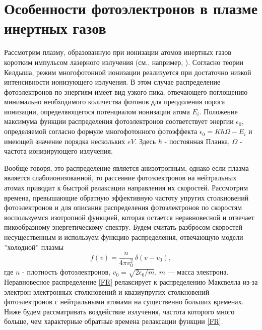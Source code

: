 \documentclass[12pt,a4paper]{article}
\numberwithin{equation}{section}
\begin{document}
\section{Особенности фотоэлектронов в плазме инертных газов}
Рассмотрим плазму, образованную при ионизации атомов инертных газов коротким импульсом лазерного излучения (см., например, \cite{refAGOSTINI1,refAGOSTINI2,refPOPOV}). Согласно теории Келдыша, режим многофотонной ионизации реализуется при достаточно низкой интенсивности ионизующего излучения. В этом случае распределение фотоэлектронов по энергиям имеет вид узкого пика, отвечающего поглощению минимально необходимого количества фотонов для преодоления порога ионизации, определяющегося потенциалом ионизации атома $E_i$. Положение максимума функции распределения фотоэлектронов соответствует энергии $\epsilon_0$, определяемой согласно формуле многофотонного фотоэффекта $\epsilon_0=K\hbar\Omega-E_i$ и имеющей значение порядка нескольких $eV$. Здесь $\hbar$ - постоянная Планка, $\Omega$ - частота ионизирующего излучения.

Вообще говоря, это распределение является анизотропным, однако если плазма является слабоионизованной, то рассеяние фотоэлектронов на нейтральных атомах приводит к быстрой релаксации направления их скоростей. Рассмотрим времена, превышающие обратную эффективную частоту упругих столкновений фотоэлектронов и для описания распределения фотоэлектронов по скоростям воспользуемся изотропной функцией, которая остается неравновесной и отвечает пикообразному энергетическому спектру. Будем считать разбросом скоростей несущественным и используем функцию распределения, отвечающую модели ''холодной'' плазмы
\begin{equation}
\label{FR}
f\left(v\right)=\frac{n}{4\pi v_0^2}\, \delta\left(v-v_0\right),
\end{equation}	
где $n$ - плотность фотоэлектронов, $v_0 = \sqrt{2\epsilon_0/m}$, $m$ — масса электрона. Неравновесное распределение \eqref{FR} релаксирует к распределению Максвелла из-за электрон-электронных столкновений и квазиупругих столкновений фотоэлектронов с нейтральными атомами на существенно больших временах. Ниже будем рассматривать воздействие излучения, частота которого много больше, чем характерные обратные времена релаксации функции \eqref{FR}.
\end{document}
